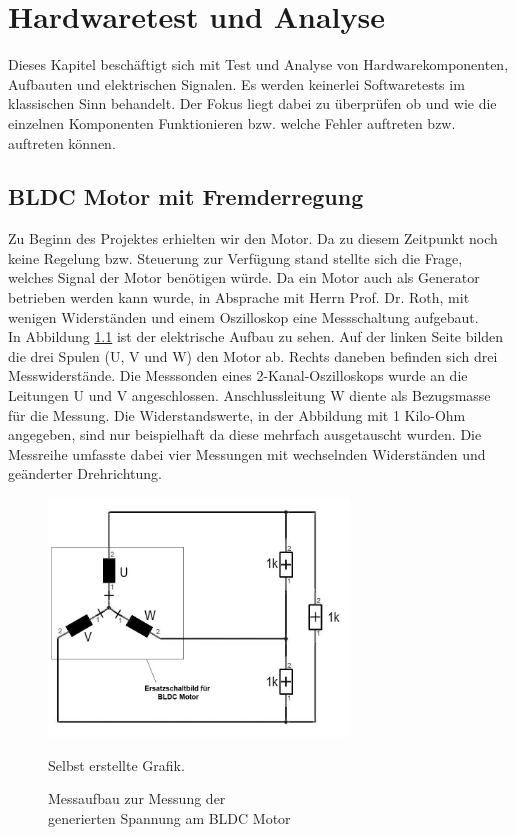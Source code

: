 
\chapter{Hardwaretest und Analyse}
\label{chap:Test_and_Analysis}
Dieses Kapitel beschäftigt sich mit Test und Analyse von Hardwarekomponenten, Aufbauten und elektrischen Signalen.
Es werden keinerlei Softwaretests im klassischen Sinn behandelt.
Der Fokus liegt dabei zu überprüfen ob und wie die einzelnen Komponenten Funktionieren bzw. welche Fehler auftreten bzw. auftreten können.

\section{BLDC Motor mit Fremderregung}
\label{sec:BLDC_mit_Fremderregung}
Zu Beginn des Projektes erhielten wir den Motor.
Da zu diesem Zeitpunkt noch keine Regelung bzw. Steuerung zur Verfügung stand stellte sich die Frage,
welches Signal der Motor benötigen würde.
Da ein Motor auch als Generator betrieben werden kann wurde, in Absprache mit Herrn Prof. Dr. Roth, mit wenigen Widerständen und einem Oszilloskop eine Messschaltung aufgebaut.\\


In Abbildung \ref{fig:BLDC_Fremderregung} ist der elektrische Aufbau zu sehen.
Auf der linken Seite bilden die drei Spulen (U, V und W) den Motor ab.
Rechts daneben befinden sich drei Messwiderstände.
Die Messsonden eines 2-Kanal-Oszilloskops wurde an die Leitungen U und V angeschlossen.
Anschlussleitung W diente als Bezugsmasse für die Messung.
Die Widerstandswerte, in der Abbildung mit 1 Kilo-Ohm angegeben, sind nur beispielhaft da diese mehrfach ausgetauscht wurden.
Die Messreihe umfasste dabei vier Messungen mit wechselnden Widerständen und geänderter Drehrichtung.


\begin{figure}[htbp]
	\centering
	\includegraphics[width=8cm]{tests/graphics/Messchaltung_Fremderregung}
	\caption[Aufbau Spannungsmessung BLDC Motor]{Messaufbau zur Messung der \\generierten Spannung am BLDC Motor}
	\quelle Selbst erstellte Grafik.
	\label{fig:BLDC_Fremderregung}
\end{figure}

